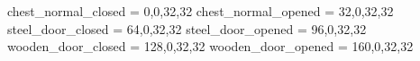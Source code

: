 chest_normal_closed = 0,0,32,32
chest_normal_opened = 32,0,32,32
steel_door_closed = 64,0,32,32
steel_door_opened = 96,0,32,32
wooden_door_closed = 128,0,32,32
wooden_door_opened = 160,0,32,32